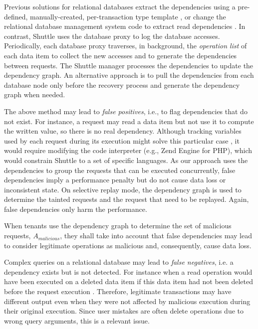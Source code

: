 Previous solutions for relational databases extract the dependencies using a pre-defined, manually-created, per-transaction type template \cite{itdb}, or change the relational database management system code to extract read dependencies \cite{phoenix}. In contrast, Shuttle uses the database proxy to log the database accesses. Periodically, each database proxy traverses, in background, the \emph{operation list} of each data item to collect the new accesses and to generate the dependencies between requests. The Shuttle manager processes the dependencies to update the dependency graph. An alternative approach is to pull the dependencies from each database node only before the recovery process and generate the dependency graph when needed. 






The above method may lead to \emph{false positives}, i.e., to flag dependencies that do not exist. For instance, a request may read a data item but not use it to compute the written value, so there is no real dependency. Although tracking variables used by each request during its execution might solve this particular case \cite{Akkus2010}, it would require modifying the code interpreter (e.g., Zend Engine for PHP), which would constrain Shuttle to a set of specific languages. As our approach uses the dependencies to group the requests that can be executed concurrently, false dependencies imply a performance penalty but do not cause data loss or inconsistent state. On selective replay mode, the dependency graph is used to determine the tainted requests and the request that need to be replayed. Again, false dependencies only harm the performance.

When tenants use the dependency graph to determine the set of malicious requests, $A_{malicious}$, they shall take into account that false dependencies may lead to consider legitimate operations as malicious and, consequently, cause data loss.

Complex queries on a relational database may lead to \emph{false negatives}, i.e. a dependency exists but is not detected. For instance when a read operation would have been executed on a deleted data item if this data item had not been deleted before the request execution \cite{Xie2008}. Therefore, legitimate transactions may have different output even when they were not affected by malicious execution during their original execution. Since user mistakes are often delete operations due to wrong query arguments, this is a relevant issue. 

